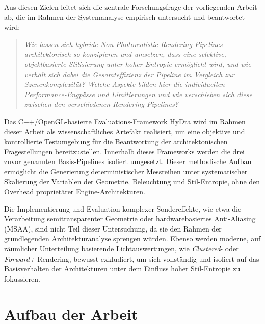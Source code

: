 Aus diesen Zielen leitet sich die zentrale Forschungsfrage der vorliegenden Arbeit ab, die im Rahmen der Systemanalyse
empirisch untersucht und beantwortet wird:
\begin{quote}
    \textit{Wie lassen sich hybride Non-Photorealistic Rendering-Pipelines architektonisch so konzipieren und
    umsetzen, dass eine selektive, objektbasierte Stilisierung unter hoher Entropie ermöglicht wird, und wie verhält
    sich dabei die Gesamteffizienz der Pipeline im Vergleich zur Szenenkomplexität? Welche Aspekte bilden hier die
    individuellen Performance-Engpässe und Limitierungen und wie verschieben sich diese zwischen den verschiedenen
    Rendering-Pipelines?}
\end{quote}

Das C++/OpenGL-basierte Evaluations-Framework \ac{HyDra} wird im Rahmen dieser Arbeit als wissenschaftliches Artefakt
realisiert, um eine objektive und kontrollierte Testumgebung für die Beantwortung der architektonischen Fragestellungen
bereitzustellen.
Innerhalb dieses Frameworks werden die drei zuvor genannten Basis-Pipelines isoliert umgesetzt.
Dieser methodische Aufbau ermöglicht die Generierung deterministischer Messreihen unter systematischer Skalierung der
Variablen der Geometrie, Beleuchtung und Stil-Entropie, ohne den Overhead proprietärer Engine-Architekturen.

Die Implementierung und Evaluation komplexer Sondereffekte, wie etwa die Verarbeitung semitransparenter Geometrie oder
hardwarebasiertes Anti-Aliasing (\ac{MSAA}), sind nicht Teil dieser Untersuchung, da sie den Rahmen der grundlegenden
Architekturanalyse sprengen würden.
Ebenso werden moderne, auf räumlicher Unterteilung basierende Lichtauswertungen, wie \textit{Clustered}- oder
\textit{Forward+}-Rendering, bewusst exkludiert, um sich vollständig und isoliert auf das Basisverhalten der
Architekturen unter dem Einfluss hoher Stil-Entropie zu fokussieren.


\section{Aufbau der Arbeit}
\label{sec:0103_setup}

